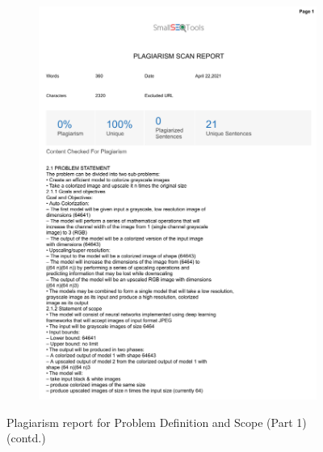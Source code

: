 \documentclass[oneside,a4paper,12pt]{report}
\begin{document}
\begin{appendices}
\begin{figure}
\begin{subfigure}[H]{\textwidth}
    	\includegraphics[scale=0.7, page=2]{plagiarism/problem_definition&scope_1.pdf}
    \end{subfigure}
    \caption{Plagiarism report for Problem Definition and Scope (Part 1) (contd.)}
    \label{PlagiarismPDS1_2}
\end{figure}


\end{appendices}
\end{document}
